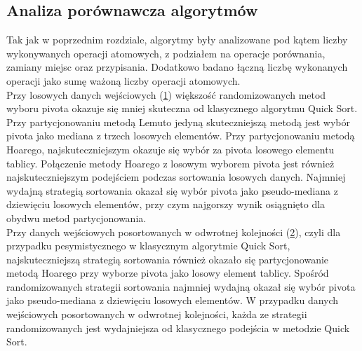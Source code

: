 \subsection{Analiza porównawcza algorytmów}
Tak jak w poprzednim rozdziale, algorytmy były analizowane pod kątem liczby wykonywanych operacji atomowych, z podziałem na operacje porównania, zamiany miejsc oraz przypisania. Dodatkowo badano łączną liczbę wykonanych operacji jako sumę ważoną liczby operacji atomowych.\\

Przy losowych danych wejściowych (\ref{fig:quick-sort-nondeterministic-pivot-random}) większość randomizowanych metod wyboru pivota okazuje się mniej skuteczna od klasycznego algorytmu Quick Sort. Przy partycjonowaniu metodą Lemuto jedyną skuteczniejszą metodą jest wybór pivota jako mediana z trzech losowych elementów. Przy partycjonowaniu metodą Hoarego, najskuteczniejszym okazuje się wybór za pivota losowego elementu tablicy. Połączenie metody Hoarego z losowym wyborem pivota jest również najskuteczniejszym podejściem podczas sortowania losowych danych. Najmniej wydajną strategią sortowania okazał się wybór pivota jako pseudo-mediana z dziewięciu losowych elementów, przy czym najgorszy wynik osiągnięto dla obydwu metod partycjonowania.\\

Przy danych wejściowych posortowanych w odwrotnej kolejności (\ref{fig:quick-sort-nondeterministic-pivot-reversed}), czyli dla przypadku pesymistycznego w klasycznym algorytmie Quick Sort, najskuteczniejszą strategią sortowania również okazało się partycjonowanie metodą Hoarego przy wyborze pivota jako losowy element tablicy. Spośród randomizowanych strategii sortowania najmniej wydajną okazał się wybór pivota jako pseudo-mediana z dziewięciu losowych elementów. W przypadku danych wejściowych posortowanych w odwrotnej kolejności, każda ze strategii randomizowanych jest wydajniejsza od klasycznego podejścia w metodzie Quick Sort.\\


\begin{figure}[]
	\centering
	
	\caption[]{}
	\label{fig:quick-sort-nondeterministic-pivot-random}
\end{figure}

\begin{figure}[]
	\centering
	
	\caption[]{}
	\label{fig:quick-sort-nondeterministic-pivot-reversed}
\end{figure}

